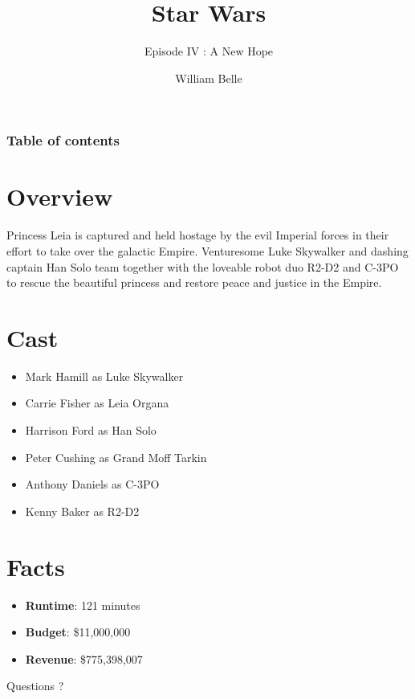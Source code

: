 \documentclass{beamer}
\title[Episode IV]{Star Wars}
\subtitle{Episode IV : A New Hope}
\author{William Belle}
\begin{document}
   
    
  \pagetitle 
  
  \begin{frame}
    \frametitle{Table of contents}
    \tableofcontents
  \end{frame}
  
  \section{Overview} 
  \begin{frame}
      Princess Leia is captured and held hostage by the evil Imperial forces in 
      their effort to take over the galactic Empire. Venturesome Luke Skywalker 
      and dashing captain Han Solo team together with the loveable robot duo 
      R2-D2 and C-3PO to rescue the beautiful princess and restore peace and 
      justice in the Empire.
  \end{frame} 
  
  \section{Cast}          
  \begin{frame}
    \begin{itemize}
      \item Mark Hamill as Luke Skywalker
      \item Carrie Fisher as Leia Organa
      \item Harrison Ford as Han Solo
      \item Peter Cushing as Grand Moff Tarkin
      \item Anthony Daniels as C-3PO
      \item Kenny Baker as R2-D2
    \end{itemize}
  \end{frame} 
  
  \section{Facts}
  \begin{frame}
    \begin{itemize}
      \item \textbf{Runtime}: 121 minutes
      \item \textbf{Budget}: \$11,000,000
      \item \textbf{Revenue}: \$775,398,007
    \end{itemize}
  \end{frame}
  
  \begin{frame}[plain]
    \begin{center}
      \Huge Questions ?
    \end{center}
  \end{frame}  
                        
\end{document}

